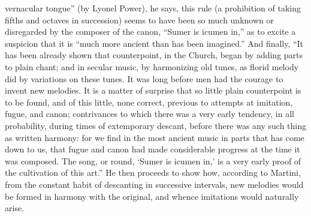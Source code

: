 vernacular tongue” (by Lyonel Power), he says, this rule (a prohibition of
taking fifths and octaves in succession) seems to have been so much unknown
or disregarded by the composer of the canon, “Sumer is icumen in,” as to
excite a suspicion that it is “much more ancient than has been imagined.”
And finally, “It has been already shown that counterpoint, in the Church,
began by adding parts to plain chant; and in secular music, by harmonizing
old tunes, as florid melody did by variations on these tunes. It was long
before men had the courage to invent new melodies. It is a matter of surprise
that so little plain counterpoint is to be found, and of this little, none
correct, previous to attempts at imitation, fugue, and canon; contrivances to which
there was a very early tendency, in all probability, during times of extemporary
descant, before there was any such thing as written harmony: for we find in the
most ancient music in parts that has come down to us, that fugue and canon had
made considerable progress at the time it was composed. The song, or round,
‘Sumer is icumen in,’ is a very early proof of the cultivation of this art.” He
then proceeds to show how, according to Martini, from the constant habit of
descanting in successive intervals, new melodies would be formed in harmony with
the original, and whence imitations would naturally arise.

